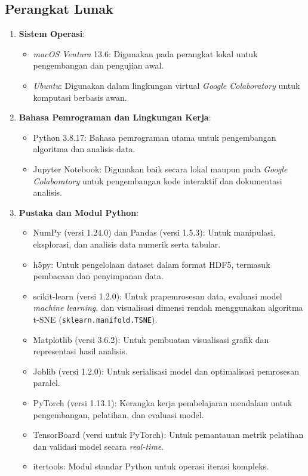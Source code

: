 \subsection{Perangkat Lunak}
\begin{enumerate}
  \item \textbf{Sistem Operasi}:
  \begin{itemize}
    \item \textit{macOS Ventura} 13.6: Digunakan pada perangkat lokal untuk pengembangan dan pengujian awal.
    \item \textit{Ubuntu}: Digunakan dalam lingkungan virtual \textit{Google Colaboratory} untuk komputasi berbasis awan.
  \end{itemize}
  
  \item \textbf{Bahasa Pemrograman dan Lingkungan Kerja}:
  \begin{itemize}
    \item Python 3.8.17: Bahasa pemrograman utama untuk pengembangan algoritma dan analisis data.
    \item Jupyter Notebook: Digunakan baik secara lokal maupun pada \textit{Google Colaboratory} untuk pengembangan kode interaktif dan dokumentasi analisis.
  \end{itemize}
  
  \item \textbf{Pustaka dan Modul Python}:
  \begin{itemize}
    \item NumPy (versi 1.24.0) dan Pandas (versi 1.5.3): Untuk manipulasi, eksplorasi, dan analisis data numerik serta tabular.
    \item h5py: Untuk pengelolaan dataset dalam format HDF5, termasuk pembacaan dan penyimpanan data.
    \item scikit-learn (versi 1.2.0): Untuk prapemrosesan data, evaluasi model \textit{machine learning}, dan visualisasi dimensi rendah menggunakan algoritma t-SNE (\texttt{sklearn.manifold.TSNE}).
    \item Matplotlib (versi 3.6.2): Untuk pembuatan visualisasi grafik dan representasi hasil analisis.
    \item Joblib (versi 1.2.0): Untuk serialisasi model dan optimalisasi pemrosesan paralel.
    \item PyTorch (versi 1.13.1): Kerangka kerja pembelajaran mendalam untuk pengembangan, pelatihan, dan evaluasi model.
    \item TensorBoard (versi untuk PyTorch): Untuk pemantauan metrik pelatihan dan validasi model secara \textit{real-time}.
    \item itertools: Modul standar Python untuk operasi iterasi kompleks.
  \end{itemize}
\end{enumerate}

